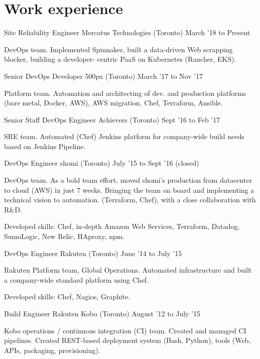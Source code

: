 \documentclass[]{cvpn}
\begin{document}
\section{Work experience}

\begin{eventlist}

\item{Site Reliability Engineer}
     {Mercatus Technologies (Toronto)}
     {March '18 to Present}
     
DevOps team.
Implemented Spinnaker,
built a data-driven Web scrapping blocker,
building a developer- centric PaaS on Kubernetes
(Rancher, EKS).

\item{Senior DevOps Developer}
     {500px (Toronto)}
     {March '17 to Nov '17}

Platform team.
Automation and architecting of dev.
and production platforms (bare metal, Docker, AWS),
AWS migration. Chef, Terraform, Ansible.

\item{Senior Staff DevOps Engineer}
     {Achievers (Toronto)}
     {Sept '16 to Feb '17}

SRE team.
Automated (Chef) Jenkins platform for company-wide build
needs based on Jenkins Pipeline.

\item{DevOps Engineer}
     {shomi (Toronto)}
     {July '15 to Sept '16 (closed)}

DevOps team. As a bold team effort, moved shomi's
production from datacenter to cloud (AWS) in just 7 weeks.
Bringing the team on board and implementing a technical
vision to automation. (Terraform, Chef),
with a close collaboration with R\&D.

Developed skills: Chef, in-depth Amazon Web Services,
Terraform, Datadog, SumoLogic, New Relic, HAproxy, npm.

\item{DevOps Engineer}
     {Rakuten (Toronto)}
     {June '14 to July '15}

Rakuten Platform team, Global Operations.
Automated infrastructure and built a company-wide
standard platform using Chef.

Developed skills: Chef, Nagios, Graphite.

\item{Build Engineer}
     {Rakuten Kobo (Toronto)}
     {August '12 to July '15}

Kobo operations / continuous integration (CI) team.
Created and managed CI pipelines.
Created REST-based deployment system (Bash, Python),
tools (Web, APIs, packaging, provisioning).


\end{eventlist}
\end{document}

